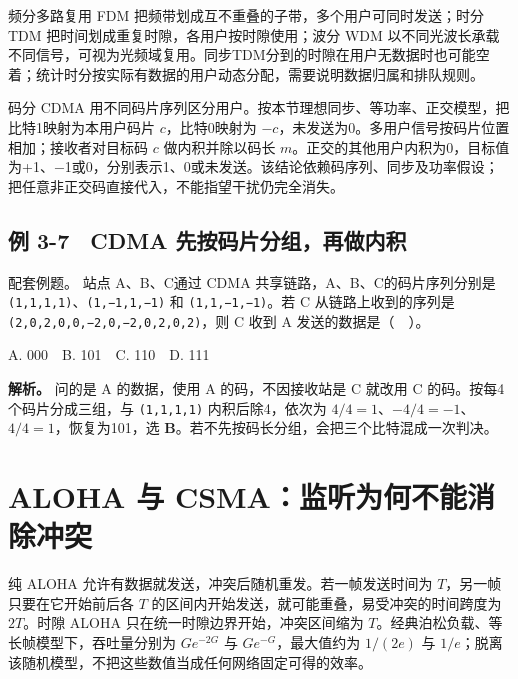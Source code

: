 频分多路复用 FDM 把频带划成互不重叠的子带，多个用户可同时发送；时分 TDM 把时间划成重复时隙，各用户按时隙使用；波分 WDM 以不同光波长承载不同信号，可视为光频域复用。同步TDM分到的时隙在用户无数据时也可能空着；统计时分按实际有数据的用户动态分配，需要说明数据归属和排队规则。

码分 CDMA 用不同码片序列区分用户。按本节理想同步、等功率、正交模型，把比特1映射为本用户码片 \(c\)，比特0映射为 \(-c\)，未发送为0。多用户信号按码片位置相加；接收者对目标码 \(c\) 做内积并除以码长 \(m\)。正交的其他用户内积为0，目标值为+1、\ensuremath{-}1或0，分别表示1、0或未发送。该结论依赖码序列、同步及功率假设；把任意非正交码直接代入，不能指望干扰仍完全消失。

\subsection{例 3-7　CDMA 先按码片分组，再做内积}\label{CN03-ex7}

{\begin{example}[配套例题]

配套例题。 站点 A、B、C通过 CDMA 共享链路，A、B、C的码片序列分别是 \texttt{(\allowbreak{}1,\allowbreak{}1,\allowbreak{}1,\allowbreak{}1)\allowbreak{}}、\texttt{(\allowbreak{}1,\allowbreak{}−1,\allowbreak{}1,\allowbreak{}−1)\allowbreak{}} 和 \texttt{(\allowbreak{}1,\allowbreak{}1,\allowbreak{}−1,\allowbreak{}−1)\allowbreak{}}。若 C 从链路上收到的序列是 \texttt{(\allowbreak{}2,\allowbreak{}0,\allowbreak{}2,\allowbreak{}0,\allowbreak{}0,\allowbreak{}−2,\allowbreak{}0,\allowbreak{}−2,\allowbreak{}0,\allowbreak{}2,\allowbreak{}0,\allowbreak{}2)\allowbreak{}}，则 C 收到 A 发送的数据是（　）。

A. 000　B. 101　C. 110　D. 111

\end{example}}

\textbf{解析。} 问的是 A 的数据，使用 A 的码，不因接收站是 C 就改用 C 的码。按每4个码片分成三组，与 \texttt{(\allowbreak{}1,\allowbreak{}1,\allowbreak{}1,\allowbreak{}1)\allowbreak{}} 内积后除4，依次为 \(4/4=1\)、\(-4/4=-1\)、\(4/4=1\)，恢复为101，选 \textbf{B}。若不先按码长分组，会把三个比特混成一次判决。

\section{ALOHA 与 CSMA：监听为何不能消除冲突}\label{CN03-10}

纯 ALOHA 允许有数据就发送，冲突后随机重发。若一帧发送时间为 \(T\)，另一帧只要在它开始前后各 \(T\) 的区间内开始发送，就可能重叠，易受冲突的时间跨度为 \(2T\)。时隙 ALOHA 只在统一时隙边界开始，冲突区间缩为 \(T\)。经典泊松负载、等长帧模型下，吞吐量分别为 \(Ge^{-2G}\) 与 \(Ge^{-G}\)，最大值约为 \(1/(2e)\) 与 \(1/e\)；脱离该随机模型，不把这些数值当成任何网络固定可得的效率。


